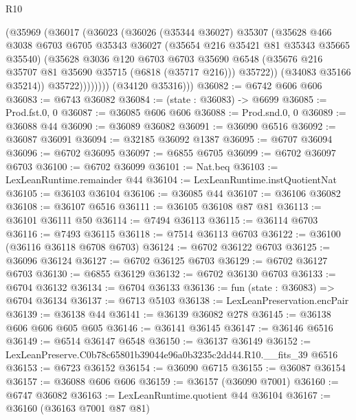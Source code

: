 \begin{lexlean}{R10}
\begin{coremodule}
                  (@35969
                    (@36017
                      (@36023
                        (@36026
                          (@35344 @36027)
                          @35307
                          (@35628
                            @466
                            @3038
                            @6703
                            @6705
                            @35343
                            @36027
                            (@35654 @216 @35421 @81 @35343 @35665 @35540)
                            (@35628
                              @3036
                              @120
                              @6703
                              @6703
                              @35690
                              @6548
                              (@35676 @216 @35707 @81 @35690 @35715 (@6818 (@35717 @216)))
                              @35722))
                          (@34083 @35166 @35214))
                        @35722))))))))
        (@34120 @35316)))
@36082 := @6742 @606 @606
@36083 := @6743 @36082
@36084 := (state : @36083) -> @6699
@36085 := Prod.fst.{0, 0}
@36087 := @36085 @606 @606
@36088 := Prod.snd.{0, 0}
@36089 := @36088 @44
@36090 := @36089 @36082
@36091 := @36090 @6516
@36092 := @36087 @36091
@36094 := @32185 @36092 @1387
@36095 := @6707 @36094
@36096 := @6702 @36095
@36097 := @6855 @6705
@36099 := @6702 @36097 @6703
@36100 := @6702 @36099
@36101 := Nat.beq
@36103 := LexLeanRuntime.remainder @44
@36104 := LexLeanRuntime.instQuotientNat
@36105 := @36103 @36104
@36106 := @36085 @44
@36107 := @36106 @36082
@36108 := @36107 @6516
@36111 := @36105 @36108 @87 @81
@36113 := @36101 @36111 @50
@36114 := @7494 @36113
@36115 := @36114 @6703
@36116 := @7493 @36115
@36118 := @7514 @36113 @6703
@36122 := @36100 (@36116 @36118 @6708 @6703)
@36124 := @6702 @36122 @6703
@36125 := @36096 @36124
@36127 := @6702 @36125 @6703
@36129 := @6702 @36127 @6703
@36130 := @6855 @36129
@36132 := @6702 @36130 @6703
@36133 := @6704 @36132
@36134 := @6704 @36133
@36136 := fun (state : @36083) => @6704 @36134
@36137 := @6713 @5103
@36138 := LexLeanPreservation.encPair
@36139 := @36138 @44
@36141 := @36139 @36082 @278
@36145 := @36138 @606 @606 @605 @605
@36146 := @36141 @36145
@36147 := @36146 @6516
@36149 := @6514 @36147 @6548
@36150 := @36137 @36149
@36152 := LexLeanPreserve.C0b78c65801b39044e96a0b3235c2dd44.R10.__fits_39 @6516
@36153 := @6723 @36152
@36154 := @36090 @6715
@36155 := @36087 @36154
@36157 := @36088 @606 @606
@36159 := @36157 (@36090 @7001)
@36160 := @6747 @36082
@36163 := LexLeanRuntime.quotient @44 @36104
@36167 := @36160 (@36163 @7001 @87 @81)

\end{coremodule}
\end{lexlean}
